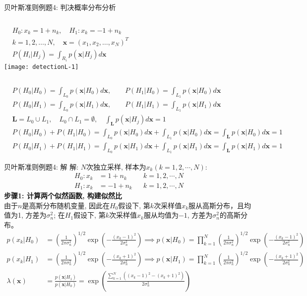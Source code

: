 \begin{frame}[shrink]{贝叶斯准则例题4: 判决概率分布分析}
\begin{columns}
	\begin{align*}
	&H_0: x_k=1+n_k,\quad H_1: x_k=-1+n_k\\
	&k=1,2,\dots,N,\quad \bm{x}=(x_1,x_2,\dots,x_N)^{T}\\
	&P(H_i|H_j)=\int_{R_i}p(\bm{x}|H_j)d\bm{x}
	\end{align*}
	\texttt{[image: detectionL-1]}
\end{columns}
\begin{align*}
&P(H_0|H_0)=\int_{L_0}p(\bm{x}|H_0)d\bm{x},\qquad P(H_1|H_0)=\int_{L_1}p(\bm{x}|H_0)d\bm{x}\\
&P(H_0|H_1)=\int_{L_0}p(\bm{x}|H_1)d\bm{x},\qquad P(H_1|H_1)=\int_{L_1}p(\bm{x}|H_1)d\bm{x}\\
&\bm{L}=L_0\cup L_1,\quad L_0\cap L_1=\emptyset, \quad \int_{\bm{L}}p(\bm{x}|H_j)d\bm{x}=1\\
&P(H_0|H_0)+P(H_1|H_0)=\int_{L_0}p(\bm{x}|H_0)d\bm{x}+\int_{L_1}p(\bm{x}|H_0)d\bm{x}=\int_{\bm{L}}p(\bm{x}|H_0)d\bm{x}=1\\
&P(H_0|H_1)+P(H_1|H_1)=\int_{L_0}p(\bm{x}|H_1)d\bm{x}+\int_{L_1}p(\bm{x}|H_1)d\bm{x}=\int_{\bm{L}}p(\bm{x}|H_1)d\bm{x}=1
\end{align*}
\end{frame}

\begin{frame}[shrink]{贝叶斯准则例题4: 解}
解: $N$次独立采样, 样本为$x_k(k=1,2,\cdots,N)$:
\begin{align*}
H_0: x_k&=1+n_k && k=1,2,\cdots,N\\
H_1: x_k&=-1+n_k && k=1,2,\cdots,N
\end{align*}
\textbf{步骤1: 计算两个似然函数, 构建似然比}\\
由于$n$是高斯分布随机变量, 因此在$H_0$假设下, 第$k$次采样值$x_k$服从高斯分布，且均值为1, 方差为$\sigma_n^2$; 在$H_1$假设下, 第$k$次采样值$x_k$服从均值为$-1$, 方差为$\sigma_n^2$的高斯分布。
\begin{align*}
p(x_k|H_0)&=\left(\frac{1}{2\pi\sigma_n^2}\right)^{1/2}\exp\left(-\frac{(x_k-1)^2}{2\sigma_n^2}\right)\implies p(\bm{x}|H_0)=\prod_{k=1}^{N}\left(\frac{1}{2\pi\sigma_n^2}\right)^{1/2}\exp\left(-\frac{(x_k-1)^2}{2\sigma_n^2}\right)\\
p(x_k|H_1)&=\left(\frac{1}{2\pi\sigma_n^2}\right)^{1/2}\exp\left(-\frac{(x_k+1)^2}{2\sigma_n^2}\right)\implies p(\bm{x}|H_1)=\prod_{k=1}^{N}\left(\frac{1}{2\pi\sigma_n^2}\right)^{1/2}\exp\left(-\frac{(x_k+1)^2}{2\sigma_n^2}\right)\\
\lambda(\bm{x})&=\frac{p(\bm{x}|H_1)}{p(\bm{x}|H_0)}=\exp\left(\frac{\sum\limits_{k=1}^{N}\left((x_k-1)^2-(x_k+1)^2\right)}{2\sigma_n^2}\right)
\end{align*} 
\end{frame}


